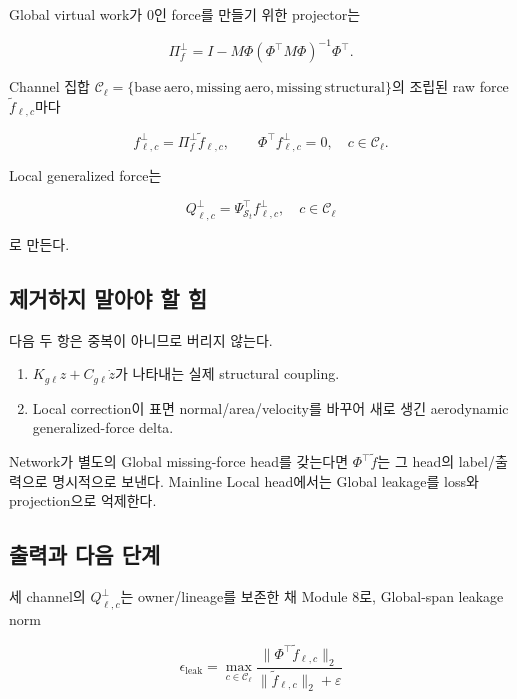 \documentclass[11pt,a4paper]{article}
\newcommand{\eps}{\varepsilon}
\begin{document}
Global virtual work가 0인 force를 만들기 위한 projector는

\begin{equation}
  \Pi_f^\perp
  =
  I-M\Phi(\Phi^\top M\Phi)^{-1}\Phi^\top.
  \label{eq:force-complement}
\end{equation}

Channel 집합
\(\mathcal C_\ell=\{\mathrm{base\ aero},\mathrm{missing\ aero},\mathrm{missing\ structural}\}\)의
조립된 raw force \(\widetilde f_{\ell,c}\)마다

\begin{equation}
  f_{\ell,c}^\perp
  =
  \Pi_f^\perp\widetilde f_{\ell,c},
  \qquad
  \Phi^\top f_{\ell,c}^\perp=0,
  \quad c\in\mathcal C_\ell.
\end{equation}

Local generalized force는

\begin{equation}
  Q_{\ell,c}^\perp
  =
  \Psi_{\mathcal S_t}^\top f_{\ell,c}^\perp,
  \quad c\in\mathcal C_\ell
\end{equation}

로 만든다.

\subsection*{제거하지 말아야 할 힘}

다음 두 항은 중복이 아니므로 버리지 않는다.

\begin{enumerate}[leftmargin=1.7em]
  \item \(K_{g\ell}z+C_{g\ell}\dot z\)가 나타내는 실제 structural coupling.
  \item Local correction이 표면 normal/area/velocity를 바꾸어 새로 생긴 aerodynamic generalized-force delta.
\end{enumerate}

Network가 별도의 Global missing-force head를 갖는다면
\(\Phi^\top\widetilde f\)는 그 head의 label/출력으로 명시적으로 보낸다.
Mainline Local head에서는 Global leakage를 loss와 projection으로 억제한다.

\subsection*{출력과 다음 단계}

세 channel의 \(Q_{\ell,c}^\perp\)는 owner/lineage를 보존한 채 Module 8로,
Global-span leakage norm

\begin{equation}
  \epsilon_{\mathrm{leak}}
  =
  \max_{c\in\mathcal C_\ell}
  \frac{\|\Phi^\top\widetilde f_{\ell,c}\|_2}
  {\|\widetilde f_{\ell,c}\|_2+\eps}
\end{equation}
\end{document}
